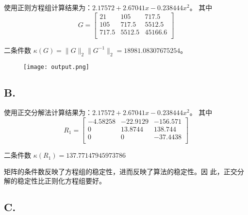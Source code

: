 \documentclass[lang=cn,a4paper,newtx,bibend=bibtex]{elegantpaper}
\begin{document}
使用正则方程组计算结果为：$2.17572 + 2.67041 x -0.238444 x^2$。
其中
\[
  G = \begin{bmatrix}
    21 & 105 & 717.5 \\
    105 & 717.5 & 5512.5 \\
    717.5 & 5512.5 & 45166.6 \\
\end{bmatrix}
\]

二条件数 $\kappa(G) = \|G\|_2\|G^{-1}\|_2 = 18981.08307675254$。

\begin{figure}[H]
  \centering
  \texttt{[image: output.png]}
\end{figure}

\subsection{B.}

使用正交分解法计算结果为：$2.17572 + 2.67041 x -0.238444 x^2$。
其中
\[
  R_1 = \begin{bmatrix}
    -4.58258 & -22.9129 & -156.571 \\
    0 & 13.8744 & 138.744 \\
    0 & 0 & -37.4438 \\
\end{bmatrix}
\]

二条件数 $\kappa(R_1) = 137.77147945973786$

矩阵的条件数反映了方程组的稳定性，进而反映了算法的稳定性。因
此，正交分解的稳定性比正则化方程组要好。

\subsection{C.}
\end{document}
